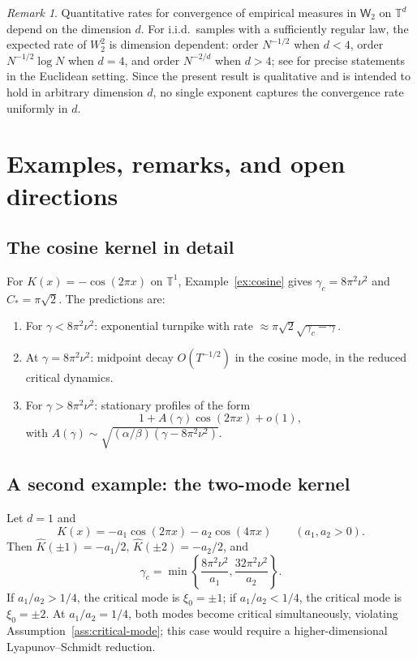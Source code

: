 \documentclass[11pt]{amsart}
\theoremstyle{definition}
\theoremstyle{remark}
\newtheorem{remark}[theorem]{Remark}
\newcommand{\Td}{\mathbb{T}^d}
\newcommand{\To}{\mathbb{T}^1}
\newcommand{\Kh}{\widehat{K}}
\newcommand{\Wt}{\mathsf{W}_2}
\newcommand{\gamc}{\gamma_c}
\begin{document}
\begin{remark}
Quantitative rates for convergence of empirical measures in $\Wt$ on $\Td$ depend on the dimension $d$. For i.i.d.\ samples with a sufficiently regular law, the expected rate of $W_2^2$ is dimension dependent: order $N^{-1/2}$ when $d<4$, order $N^{-1/2}\log N$ when $d=4$, and order $N^{-2/d}$ when $d>4$; see \cite{FG15} for precise statements in the Euclidean setting. Since the present result is qualitative and is intended to hold in arbitrary dimension $d$, no single exponent captures the convergence rate uniformly in $d$.
\end{remark}

\section{Examples, remarks, and open directions}
\label{sec:remarks}

\subsection{The cosine kernel in detail}
\label{sub:cosine-detail}

For $K(x)=-\cos(2\pi x)$ on $\To$, Example~\ref{ex:cosine} gives $\gamc=8\pi^2\nu^2$ and $C_\ast=\pi\sqrt{2}$. The predictions are:
\begin{enumerate}[label=\textup{(\arabic*)},leftmargin=2em]
\item For $\gamma<8\pi^2\nu^2$: exponential turnpike with rate $\approx \pi\sqrt{2}\sqrt{\gamc-\gamma}$.
\item At $\gamma=8\pi^2\nu^2$: midpoint decay $O(T^{-1/2})$ in the cosine mode, in the reduced critical dynamics.
\item For $\gamma>8\pi^2\nu^2$: stationary profiles of the form
\[
1+A(\gamma)\cos(2\pi x)+o(1),
\]
with $A(\gamma)\sim\sqrt{(\alpha/\beta)(\gamma-8\pi^2\nu^2)}$.
\end{enumerate}

\subsection{A second example: the two-mode kernel}
\label{sub:two-mode}

Let $d=1$ and
\[
K(x)=-a_1\cos(2\pi x)-a_2\cos(4\pi x)
\qquad (a_1,a_2>0).
\]
Then $\Kh(\pm 1)=-a_1/2$, $\Kh(\pm 2)=-a_2/2$, and
\[
\gamc = \min\!\left\{\frac{8\pi^2\nu^2}{a_1}, \frac{32\pi^2\nu^2}{a_2}\right\}.
\]
If $a_1/a_2>1/4$, the critical mode is $\xi_0=\pm 1$; if $a_1/a_2<1/4$, the critical mode is $\xi_0=\pm 2$. At $a_1/a_2=1/4$, both modes become critical simultaneously, violating Assumption~\ref{ass:critical-mode}; this case would require a higher-dimensional Lyapunov--Schmidt reduction.
\end{document}
